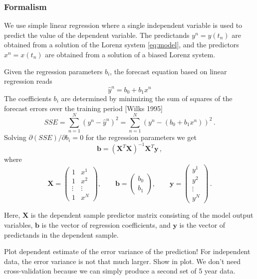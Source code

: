 \documentclass[10pt]{article}
\newcommand \be {\begin{equation}}
\newcommand \ee {\end{equation}}
\begin{document}
\subsubsection{Formalism}

We use simple linear regression where a single independent variable is used to predict the value of the dependent variable. The predictands $y^n=y(t_n)$ are obtained from a solution of the Lorenz system \eqref{eq:model}, and the predictors $x^n=x(t_n)$ are obtained from a solution of a biased Lorenz system.

Given the regression parameters $b_i$, the forecast equation based on linear regression reads
\[ \hat{y}^n = b_0 + b_1 x^n  \]
The coefficients $b_i$ are determined by minimizing the sum of squares of the forecast errors over the training period [Wilks 1995]
\[ SSE = \sum_{n=1}^N (y^n - \hat{y}^n)^2 = \sum_{n=1}^N (y^n - (b_0 + b_1 x^n))^2  \,.\]  
Solving $\partial (SSE) / \partial b_i = 0$ for the regression parameters we get
\be\label{eq:regr} \mathbf{b} = (\mathbf{X}^T \mathbf{X})^{-1} \mathbf{X}^T \mathbf{y}\,,  \ee
where 
\[ \mathbf{X} = 
\begin{pmatrix} 
1 & x^1 \\
1 & x^2 \\
\vdots & \vdots \\
1 & x^N 
\end{pmatrix}, \qquad 
\mathbf{b} = \begin{pmatrix} b_0 \\ b_1 \end{pmatrix}, \qquad 
\mathbf{y} =  \begin{pmatrix} y^1 \\ y^2 \\ \vdots \\ y^N \end{pmatrix}\,.  \]

Here, $\mathbf{X}$ is the dependent sample predictor matrix consisting of the model output variables, $\mathbf{b}$ is the vector of regression coefficients, and $\mathbf{y}$ is the vector of predictands in the dependent sample.

Plot dependent estimate of the error variance of the prediction! For independent data, the error variance is not that much larger. Show in plot.  We don't need cross-validation because we can simply produce a second set of 5 year data.
\end{document}
